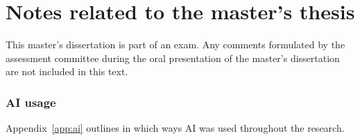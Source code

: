 \chapter*{Notes related to the master's thesis}

This master's dissertation is part of an exam. Any comments formulated by the assessment committee during the oral presentation of the master's dissertation are not included in this text.

\subsection*{AI usage}

Appendix~\ref{app:ai} outlines in which ways AI was used throughout the research.